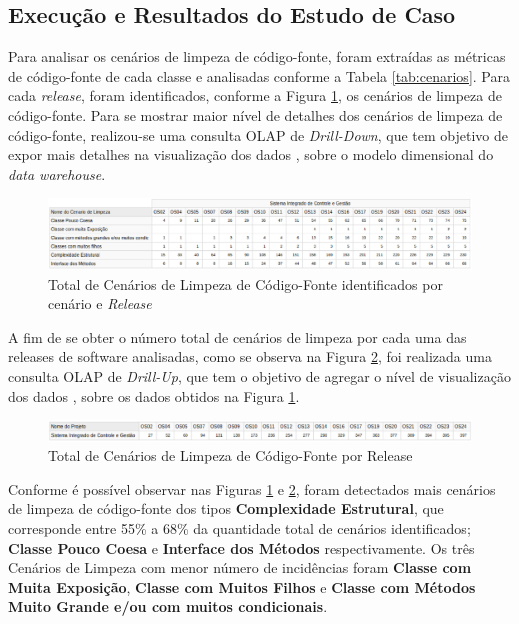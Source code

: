\subsection{Execução e Resultados do Estudo de Caso}
\label{sec:resultados}
Para analisar os cenários de limpeza de código-fonte, foram extraídas as métricas de código-fonte de cada classe e analisadas conforme a Tabela \ref{tab:cenarios}. Para cada \textit{release}, foram identificados, conforme a Figura \ref{fig:cenarios-release}, os cenários de limpeza de código-fonte. Para se mostrar maior nível de detalhes dos cenários de limpeza de código-fonte, realizou-se uma consulta OLAP de \textit{Drill-Down}, que tem objetivo de expor mais detalhes na visualização dos dados \cite{Kimball2002}, sobre o modelo dimensional do \textit{data warehouse}. 


\begin{figure}[ht!]
\centering
\includegraphics[keepaspectratio=true,scale=0.43]{figuras/total-cenario-tipo.eps}
\caption{Total de Cenários de Limpeza de Código-Fonte identificados por cenário e \textit{Release}}
\label{fig:cenarios-release}
\end{figure}
\FloatBarrier

A fim de se obter o número total de cenários de limpeza por cada uma das releases de software analisadas, como se observa na Figura \ref{fig:cenarios-total}, foi realizada uma consulta OLAP de \textit{Drill-Up}, que tem o objetivo de agregar o nível de visualização dos dados \cite{Kimball2002}, sobre os dados obtidos na Figura \ref{fig:cenarios-release}.

\begin{figure}[ht!]
\centering
\includegraphics[keepaspectratio=true,scale=0.45]{figuras/total-cenarios-release.eps}
\caption{Total de Cenários de Limpeza de Código-Fonte por Release}
\label{fig:cenarios-total}
\end{figure}
\FloatBarrier

Conforme é possível observar nas Figuras \ref{fig:cenarios-release} e \ref{fig:cenarios-total}, foram detectados mais cenários de limpeza de código-fonte dos tipos \textbf{Complexidade Estrutural}, que corresponde entre 55\% a 68\% da quantidade total de cenários identificados; \textbf{Classe Pouco Coesa} e \textbf{Interface dos Métodos} respectivamente. Os três Cenários de Limpeza com menor número de incidências foram \textbf{Classe com Muita Exposição}, \textbf{Classe com Muitos Filhos} e \textbf{Classe com Métodos Muito Grande e/ou com muitos condicionais}.

